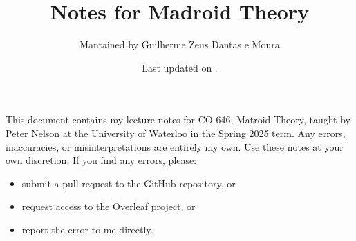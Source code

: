 \documentclass[notitlepage]{scrbook}
\title{Notes for Madroid Theory}
\author{Mantained by Guilherme Zeus Dantas e Moura}
\date{Last updated on \DTMnow.}
\theoremstyle{definition}
\begin{document}
	\maketitle

  This document contains my lecture notes for CO 646, Matroid Theory,
  taught by Peter Nelson at the University of Waterloo in the Spring 2025 term.
  Any errors, inaccuracies, or misinterpretations are entirely my own.
  Use these notes at your own discretion.
  If you find any errors, please:
  \begin{itemize}
    \item submit a pull request to the GitHub repository, or 
    \item request access to the Overleaf project, or
    \item report the error to me directly.
  \end{itemize}

  \tableofcontents

  

\end{document}
